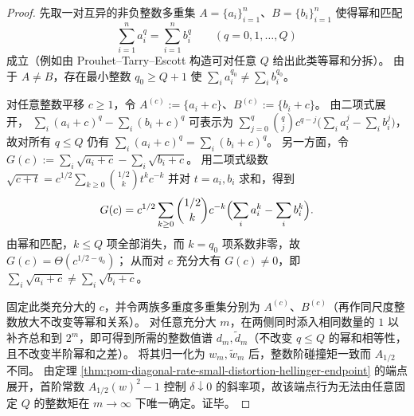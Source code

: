 \begin{proof}
先取一对互异的非负整数多重集 \(A=\{a_i\}_{i=1}^n\)、\(B=\{b_i\}_{i=1}^n\) 使得幂和匹配
\[
\sum_{i=1}^n a_i^q=\sum_{i=1}^n b_i^q\qquad(q=0,1,\dots,Q)
\]
成立（例如由 Prouhet--Tarry--Escott 构造可对任意 \(Q\) 给出此类等幂和分拆）。
由于 \(A\neq B\)，存在最小整数 \(q_0\ge Q+1\) 使 \(\sum_i a_i^{q_0}\ne \sum_i b_i^{q_0}\)。
\par
对任意整数平移 \(c\ge 1\)，令 \(A^{(c)}:=\{a_i+c\}\)、\(B^{(c)}:=\{b_i+c\}\)。
由二项式展开，
\(
\sum_i (a_i+c)^q-\sum_i (b_i+c)^q
\)
可表示为 \(\sum_{j=0}^q \binom{q}{j}c^{q-j}\bigl(\sum_i a_i^j-\sum_i b_i^j\bigr)\)，
故对所有 \(q\le Q\) 仍有 \(\sum_i (a_i+c)^q=\sum_i (b_i+c)^q\)。
另一方面，令
\(
G(c):=\sum_i \sqrt{a_i+c}-\sum_i \sqrt{b_i+c}
\)。
用二项式级数
\(
\sqrt{c+t}=c^{1/2}\sum_{k\ge 0}\binom{1/2}{k}t^k c^{-k}
\)
并对 \(t=a_i,b_i\) 求和，得到
\[
G(c)
=c^{1/2}\sum_{k\ge 0}\binom{1/2}{k}c^{-k}\Bigl(\sum_i a_i^k-\sum_i b_i^k\Bigr).
\]
由幂和匹配，\(k\le Q\) 项全部消失，而 \(k=q_0\) 项系数非零，故 \(G(c)=\Theta(c^{1/2-q_0})\)；
从而对 \(c\) 充分大有 \(G(c)\ne 0\)，即 \(\sum_i \sqrt{a_i+c}\ne \sum_i \sqrt{b_i+c}\)。
\par
固定此类充分大的 \(c\)，并令两族多重度多重集分别为 \(A^{(c)}\)、\(B^{(c)}\)（再作同尺度整数放大不改变等幂和关系）。
对任意充分大 \(m\)，在两侧同时添入相同数量的 \(1\) 以补齐总和到 \(2^m\)，即可得到所需的整数值谱 \(d_m,\widetilde d_m\)（不改变 \(q\le Q\) 的幂和相等性，且不改变半阶幂和之差）。
将其归一化为 \(w_m,\widetilde w_m\) 后，整数阶碰撞矩一致而 \(A_{1/2}\) 不同。
由定理 \ref{thm:pom-diagonal-rate-small-distortion-hellinger-endpoint} 的端点展开，首阶常数 \(A_{1/2}(w)^2-1\) 控制 \(\delta\downarrow 0\) 的斜率项，故该端点行为无法由任意固定 \(Q\) 的整数矩在 \(m\to\infty\) 下唯一确定。证毕。
\end{proof}


